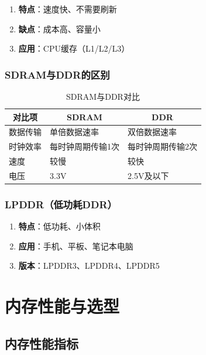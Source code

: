 \documentclass[12pt,UTF8]{ctexbook}
\begin{document}
\begin{enumerate}
    \item \textbf{特点}：速度快、不需要刷新
    \item \textbf{缺点}：成本高、容量小
    \item \textbf{应用}：CPU缓存（L1/L2/L3）
\end{enumerate}

\section{SDRAM与DDR的区别}

\begin{table}[H]
    \centering
    \begin{tabularx}{\textwidth}{|p{4cm}|X|X|}
        \hline
        \multicolumn{1}{|c|}{\textbf{对比项}} & \multicolumn{1}{c|}{\textbf{SDRAM}} & \multicolumn{1}{c|}{\textbf{DDR}} \\
        \hline
        数据传输 & 单倍数据速率 & 双倍数据速率 \\
        \hline
        时钟效率 & 每时钟周期传输1次 & 每时钟周期传输2次 \\
        \hline
        速度 & 较慢 & 较快 \\
        \hline
        电压 & 3.3V & 2.5V及以下 \\
        \hline
    \end{tabularx}
    \caption{SDRAM与DDR对比}
    \label{tab:sdram_vs_ddr}
\end{table}

\section{LPDDR（低功耗DDR）}

\begin{enumerate}
    \item \textbf{特点}：低功耗、小体积
    \item \textbf{应用}：手机、平板、笔记本电脑
    \item \textbf{版本}：LPDDR3、LPDDR4、LPDDR5
\end{enumerate}

\part{内存性能与选型}

\chapter{内存性能指标}
\end{document}
